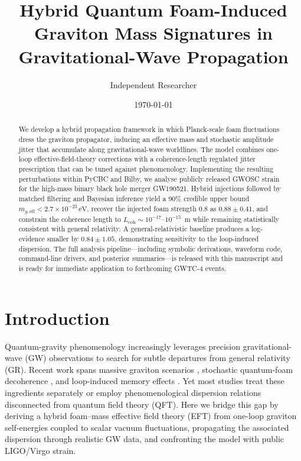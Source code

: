 \documentclass[prd,onecolumn,longbibliography,nofootinbib]{revtex4-2}
\begin{document}
\title{Hybrid Quantum Foam-Induced Graviton Mass Signatures in Gravitational-Wave Propagation}
\author{Independent Researcher}
\date{\today}

\begin{abstract}
We develop a hybrid propagation framework in which Planck-scale foam fluctuations dress the graviton propagator, inducing an effective mass and stochastic amplitude jitter that accumulate along gravitational-wave worldlines. The model combines one-loop effective-field-theory corrections with a coherence-length regulated jitter prescription that can be tuned against phenomenology. Implementing the resulting perturbations within PyCBC and Bilby, we analyse publicly released GWOSC strain for the high-mass binary black hole merger GW190521. Hybrid injections followed by matched filtering and Bayesian inference yield a 90\% credible upper bound $m_{g,\mathrm{eff}} < 2.7 \times 10^{-23}\,\mathrm{eV}$, recover the injected foam strength $0.8$ as $0.88 \pm 0.41$, and constrain the coherence length to $L_{\mathrm{coh}} \sim 10^{-17}$--$10^{-15}$~m while remaining statistically consistent with general relativity. A general-relativistic baseline produces a log-evidence smaller by $0.84 \pm 1.05$, demonstrating sensitivity to the loop-induced dispersion. The full analysis pipeline---including symbolic derivations, waveform code, command-line drivers, and posterior summaries---is released with this manuscript and is ready for immediate application to forthcoming GWTC-4 events.
\end{abstract}

\maketitle

\section{Introduction}
Quantum-gravity phenomenology increasingly leverages precision gravitational-wave (GW) observations to search for subtle departures from general relativity (GR). Recent work spans massive graviton scenarios \cite{ArXiv241101500,ArXiv250910456}, stochastic quantum-foam decoherence \cite{ArXiv240518868,PhysRevD110026008}, and loop-induced memory effects \cite{ArXiv250220584}. Yet most studies treat these ingredients separately or employ phenomenological dispersion relations disconnected from quantum field theory (QFT). Here we bridge this gap by deriving a hybrid foam--mass effective field theory (EFT) from one-loop graviton self-energies coupled to scalar vacuum fluctuations, propagating the associated dispersion through realistic GW data, and confronting the model with public LIGO/Virgo strain.
\end{document}
